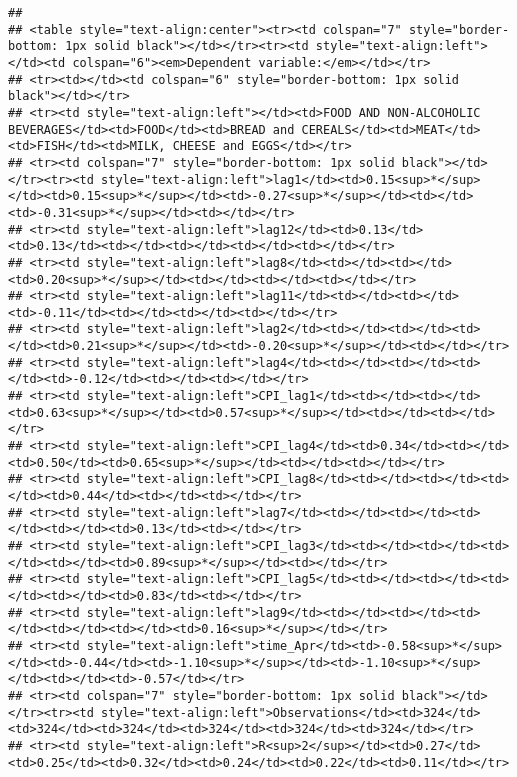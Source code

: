\documentclass[
]{article}
\begin{document}
\begin{verbatim}
## 
## <table style="text-align:center"><tr><td colspan="7" style="border-bottom: 1px solid black"></td></tr><tr><td style="text-align:left"></td><td colspan="6"><em>Dependent variable:</em></td></tr>
## <tr><td></td><td colspan="6" style="border-bottom: 1px solid black"></td></tr>
## <tr><td style="text-align:left"></td><td>FOOD AND NON-ALCOHOLIC BEVERAGES</td><td>FOOD</td><td>BREAD and CEREALS</td><td>MEAT</td><td>FISH</td><td>MILK, CHEESE and EGGS</td></tr>
## <tr><td colspan="7" style="border-bottom: 1px solid black"></td></tr><tr><td style="text-align:left">lag1</td><td>0.15<sup>*</sup></td><td>0.15<sup>*</sup></td><td>-0.27<sup>*</sup></td><td></td><td>-0.31<sup>*</sup></td><td></td></tr>
## <tr><td style="text-align:left">lag12</td><td>0.13</td><td>0.13</td><td></td><td></td><td></td><td></td></tr>
## <tr><td style="text-align:left">lag8</td><td></td><td></td><td>0.20<sup>*</sup></td><td></td><td></td><td></td></tr>
## <tr><td style="text-align:left">lag11</td><td></td><td></td><td>-0.11</td><td></td><td></td><td></td></tr>
## <tr><td style="text-align:left">lag2</td><td></td><td></td><td></td><td>0.21<sup>*</sup></td><td>-0.20<sup>*</sup></td><td></td></tr>
## <tr><td style="text-align:left">lag4</td><td></td><td></td><td></td><td>-0.12</td><td></td><td></td></tr>
## <tr><td style="text-align:left">CPI_lag1</td><td></td><td></td><td>0.63<sup>*</sup></td><td>0.57<sup>*</sup></td><td></td><td></td></tr>
## <tr><td style="text-align:left">CPI_lag4</td><td>0.34</td><td></td><td>0.50</td><td>0.65<sup>*</sup></td><td></td><td></td></tr>
## <tr><td style="text-align:left">CPI_lag8</td><td></td><td></td><td></td><td>0.44</td><td></td><td></td></tr>
## <tr><td style="text-align:left">lag7</td><td></td><td></td><td></td><td></td><td>0.13</td><td></td></tr>
## <tr><td style="text-align:left">CPI_lag3</td><td></td><td></td><td></td><td></td><td>0.89<sup>*</sup></td><td></td></tr>
## <tr><td style="text-align:left">CPI_lag5</td><td></td><td></td><td></td><td></td><td>0.83</td><td></td></tr>
## <tr><td style="text-align:left">lag9</td><td></td><td></td><td></td><td></td><td></td><td>0.16<sup>*</sup></td></tr>
## <tr><td style="text-align:left">time_Apr</td><td>-0.58<sup>*</sup></td><td>-0.44</td><td>-1.10<sup>*</sup></td><td>-1.10<sup>*</sup></td><td></td><td>-0.57</td></tr>
## <tr><td colspan="7" style="border-bottom: 1px solid black"></td></tr><tr><td style="text-align:left">Observations</td><td>324</td><td>324</td><td>324</td><td>324</td><td>324</td><td>324</td></tr>
## <tr><td style="text-align:left">R<sup>2</sup></td><td>0.27</td><td>0.25</td><td>0.32</td><td>0.24</td><td>0.22</td><td>0.11</td></tr>

\end{verbatim}
\end{document}

